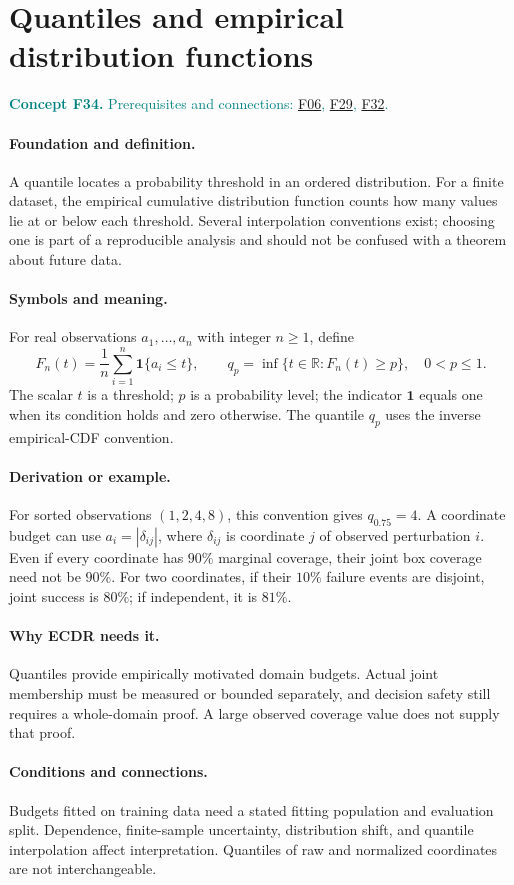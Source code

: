 \documentclass[11pt,a4paper]{article}
\newcommand{\R}{\mathbb R}
\newcommand{\conceptid}{Front matter}
\newcommand{\concept}[3]{\clearpage\renewcommand{\conceptid}{#1}%
\section{#2}\label{concept:#1}%
\textcolor{teal}{\textbf{Concept #1.} Prerequisites and connections: #3.}\par
\typeout{ECDR-CONCEPT-START #1 PAGE=\thepage}}
\begin{document}
\concept{F34}{Quantiles and empirical distribution functions}{\hyperref[concept:F06]{F06}, \hyperref[concept:F29]{F29}, \hyperref[concept:F32]{F32}}
\paragraph{Foundation and definition.}
A quantile locates a probability threshold in an ordered distribution.
For a finite dataset, the empirical cumulative distribution function
counts how many values lie at or below each threshold. Several
interpolation conventions exist; choosing one is part of a reproducible
analysis and should not be confused with a theorem about future data.
\paragraph{Symbols and meaning.}
For real observations $a_1,\ldots,a_n$ with integer $n\ge1$, define
\[
 F_n(t)=\frac1n\sum_{i=1}^{n}\mathbf1\{a_i\le t\},
 \qquad q_p=\inf\{t\in\R:F_n(t)\ge p\},\quad 0<p\le1.
\]
The scalar $t$ is a threshold; $p$ is a probability level; the indicator
$\mathbf1$ equals one when its condition holds and zero otherwise.
The quantile $q_p$ uses the inverse empirical-CDF convention.
\paragraph{Derivation or example.}
For sorted observations $(1,2,4,8)$, this convention gives
$q_{0.75}=4$. A coordinate budget can use
$a_i=|\delta_{ij}|$, where $\delta_{ij}$ is coordinate $j$ of
observed perturbation $i$. Even if every coordinate has $90\%$
marginal coverage, their joint box coverage need not be $90\%$.
For two coordinates, if their $10\%$ failure events are disjoint,
joint success is $80\%$; if independent, it is $81\%$.
\paragraph{Why ECDR needs it.}
Quantiles provide empirically motivated domain budgets. Actual joint
membership must be measured or bounded separately, and decision safety
still requires a whole-domain proof. A large observed coverage value
does not supply that proof.
\paragraph{Conditions and connections.}
Budgets fitted on training data need a stated fitting population and
evaluation split. Dependence, finite-sample uncertainty, distribution
shift, and quantile interpolation affect interpretation. Quantiles of
raw and normalized coordinates are not interchangeable.
\par\label{endconcept:F34}
\end{document}
